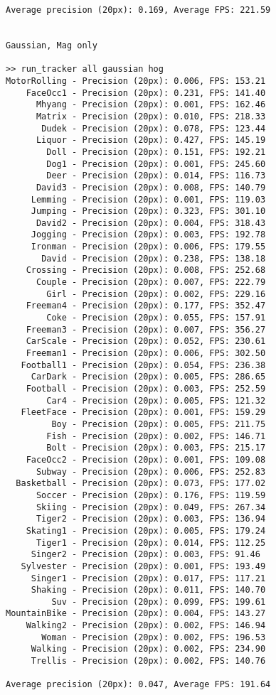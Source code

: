 \begin{lstlisting}
Average precision (20px): 0.169, Average FPS: 221.59


Gaussian, Mag only

>> run_tracker all gaussian hog
MotorRolling - Precision (20px): 0.006, FPS: 153.21
    FaceOcc1 - Precision (20px): 0.231, FPS: 141.40
      Mhyang - Precision (20px): 0.001, FPS: 162.46
      Matrix - Precision (20px): 0.010, FPS: 218.33
       Dudek - Precision (20px): 0.078, FPS: 123.44
      Liquor - Precision (20px): 0.427, FPS: 145.19
        Doll - Precision (20px): 0.151, FPS: 192.21
        Dog1 - Precision (20px): 0.001, FPS: 245.60
        Deer - Precision (20px): 0.014, FPS: 116.73
      David3 - Precision (20px): 0.008, FPS: 140.79
     Lemming - Precision (20px): 0.001, FPS: 119.03
     Jumping - Precision (20px): 0.323, FPS: 301.10
      David2 - Precision (20px): 0.004, FPS: 318.43
     Jogging - Precision (20px): 0.003, FPS: 192.78
     Ironman - Precision (20px): 0.006, FPS: 179.55
       David - Precision (20px): 0.238, FPS: 138.18
    Crossing - Precision (20px): 0.008, FPS: 252.68
      Couple - Precision (20px): 0.007, FPS: 222.79
        Girl - Precision (20px): 0.002, FPS: 229.16
    Freeman4 - Precision (20px): 0.177, FPS: 352.47
        Coke - Precision (20px): 0.055, FPS: 157.91
    Freeman3 - Precision (20px): 0.007, FPS: 356.27
    CarScale - Precision (20px): 0.052, FPS: 230.61
    Freeman1 - Precision (20px): 0.006, FPS: 302.50
   Football1 - Precision (20px): 0.054, FPS: 236.38
     CarDark - Precision (20px): 0.005, FPS: 286.65
    Football - Precision (20px): 0.003, FPS: 252.59
        Car4 - Precision (20px): 0.005, FPS: 121.32
   FleetFace - Precision (20px): 0.001, FPS: 159.29
         Boy - Precision (20px): 0.005, FPS: 211.75
        Fish - Precision (20px): 0.002, FPS: 146.71
        Bolt - Precision (20px): 0.003, FPS: 215.17
    FaceOcc2 - Precision (20px): 0.001, FPS: 109.08
      Subway - Precision (20px): 0.006, FPS: 252.83
  Basketball - Precision (20px): 0.073, FPS: 177.02
      Soccer - Precision (20px): 0.176, FPS: 119.59
      Skiing - Precision (20px): 0.049, FPS: 267.34
      Tiger2 - Precision (20px): 0.003, FPS: 136.94
    Skating1 - Precision (20px): 0.005, FPS: 179.24
      Tiger1 - Precision (20px): 0.014, FPS: 112.25
     Singer2 - Precision (20px): 0.003, FPS: 91.46
   Sylvester - Precision (20px): 0.001, FPS: 193.49
     Singer1 - Precision (20px): 0.017, FPS: 117.21
     Shaking - Precision (20px): 0.011, FPS: 140.70
         Suv - Precision (20px): 0.099, FPS: 199.61
MountainBike - Precision (20px): 0.004, FPS: 143.27
    Walking2 - Precision (20px): 0.002, FPS: 146.94
       Woman - Precision (20px): 0.002, FPS: 196.53
     Walking - Precision (20px): 0.002, FPS: 234.90
     Trellis - Precision (20px): 0.002, FPS: 140.76

Average precision (20px): 0.047, Average FPS: 191.64

\end{lstlisting}


